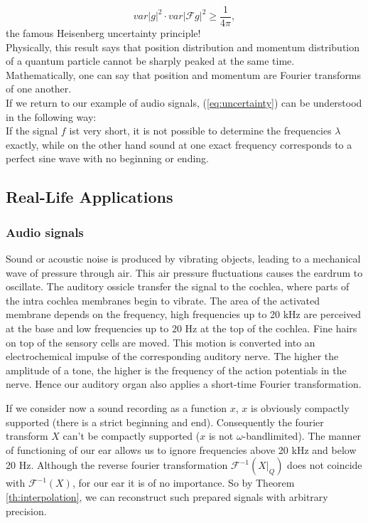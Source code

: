 \documentclass[a4paper, 11pt]{scrreprt}
\newcommand{\FF}{\mathcal{F}}
\begin{document}
	\[var|g|^2 \cdot var|\FF g|^2 \geq \frac{1}{4\pi},\]
the famous Heisenberg uncertainty principle!\\	
Physically, this result says that position distribution and momentum distribution of a quantum particle cannot be sharply peaked at the same time. Mathematically, one can say that position and momentum are Fourier transforms of one another.\\
If we return to our example of audio signals, (\ref{eq:uncertainty}) can be understood in the following way:\\
If the signal \(f\) ist very short, it is not possible to determine the frequencies \(\lambda\) exactly, while on the other hand sound at one exact frequency corresponds to a perfect sine wave with no beginning or ending.

\subsection{Real-Life Applications}
\label{se:real-life}

\subsubsection{Audio signals}
Sound or acoustic noise is produced by vibrating objects, leading to a mechanical wave of pressure through air. This air pressure fluctuations causes the eardrum to oscillate. The auditory ossicle transfer the signal to the cochlea, where parts of the intra cochlea membranes begin to vibrate. The area of the activated membrane depends on the frequency, high frequencies up to 20 kHz are perceived at the base and low frequencies up to 20 Hz at the top of the cochlea. Fine hairs on top of the sensory cells are moved. This motion is converted into an electrochemical impulse of the corresponding auditory nerve. The higher the amplitude of a tone, the higher is the frequency of the action potentials in the nerve.
Hence our auditory organ also applies a short-time Fourier transformation. 

If we consider now a sound recording as a function $x$, $x$ is obviously compactly supported (there is a strict beginning and end). Consequently the fourier transform $X$ can't be compactly supported ($x$ is not $\omega$-bandlimited). The manner of functioning of our ear allows us to ignore frequencies above 20 kHz and below 20 Hz. Although the reverse fourier transformation $\FF^{-1}(X|_{Q})$ does not coincide with $\FF^{-1}(X)$, for our ear it is of no importance. So by Theorem \ref{th:interpolation}, we can reconstruct such prepared signals with arbitrary precision.
\end{document}
